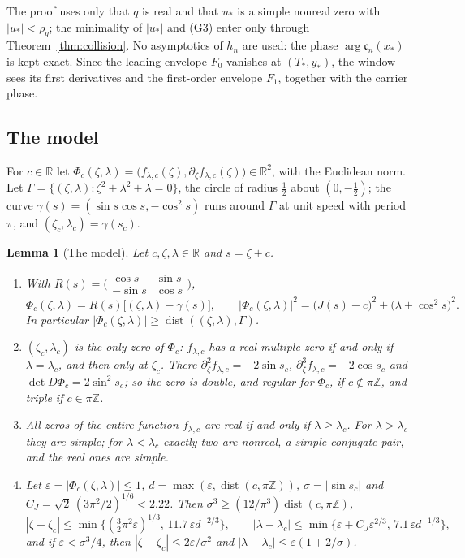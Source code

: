 \documentclass[11pt]{amsart}
\newtheorem{lemma}[theorem]{Lemma}
\theoremstyle{definition}
\theoremstyle{remark}
\numberwithin{equation}{section}
\newcommand{\R}{\mathbb{R}}
\newcommand{\Z}{\mathbb{Z}}
\newcommand{\eps}{\varepsilon}
\DeclareMathOperator{\dist}{dist}
\begin{document}
The proof uses only that $q$ is real and that $u_*$ is a simple nonreal zero with $|u_*|<\rho_q$; the minimality of $|u_*|$
and (G3) enter only through Theorem~\ref{thm:collision}. No asymptotics of $h_n$ are used: the phase
$\arg\mathfrak c_n(x_*)$ is kept exact. Since the leading envelope $F_0$ vanishes at $(T_*,y_*)$, the window sees its
first derivatives and the first-order envelope $F_1$, together with the carrier phase.

\subsection{The model}\label{sec:model}

For $c\in\R$ let $\Phi_c(\zeta,\lambda)=\bigl(f_{\lambda,c}(\zeta),\partial_\zeta f_{\lambda,c}(\zeta)\bigr)\in\R^2$, with the
Euclidean norm. Let $\Gamma=\{(\zeta,\lambda):\zeta^2+\lambda^2+\lambda=0\}$, the circle of radius $\frac12$ about
$(0,-\frac12)$; the curve $\gamma(s)=(\sin s\cos s,-\cos^2s)$ runs around $\Gamma$ at unit speed with period $\pi$, and
$(\zeta_c,\lambda_c)=\gamma(s_c)$.

\begin{lemma}[The model]\label{lem:model}
Let $c,\zeta,\lambda\in\R$ and $s=\zeta+c$.
\begin{enumerate}
\item[(a)] With $R(s)=\bigl(\begin{smallmatrix}\cos s&\sin s\\-\sin s&\cos s\end{smallmatrix}\bigr)$,
\[
\Phi_c(\zeta,\lambda)=R(s)\bigl[(\zeta,\lambda)-\gamma(s)\bigr],\qquad
|\Phi_c(\zeta,\lambda)|^2=\bigl(J(s)-c\bigr)^2+\bigl(\lambda+\cos^2s\bigr)^2 .
\]
In particular $|\Phi_c(\zeta,\lambda)|\ge\dist((\zeta,\lambda),\Gamma)$.
\item[(b)] $(\zeta_c,\lambda_c)$ is the only zero of $\Phi_c$: $f_{\lambda,c}$ has a real multiple zero if and only if
$\lambda=\lambda_c$, and then only at $\zeta_c$. There $\partial_\zeta^2f_{\lambda,c}=-2\sin s_c$,
$\partial_\zeta^3f_{\lambda,c}=-2\cos s_c$ and $\det D\Phi_c=2\sin^2s_c$; so the zero is double, and regular for
$\Phi_c$, if $c\notin\pi\Z$, and triple if $c\in\pi\Z$.
\item[(c)] All zeros of the entire function $f_{\lambda,c}$ are real if and only if $\lambda\ge\lambda_c$. For
$\lambda>\lambda_c$ they are simple; for $\lambda<\lambda_c$ exactly two are nonreal, a simple conjugate pair, and the
real ones are simple.
\item[(d)] Let $\eps=|\Phi_c(\zeta,\lambda)|\le1$, $d=\max(\eps,\dist(c,\pi\Z))$, $\sigma=|\sin s_c|$ and
$C_J=\sqrt2\,(3\pi^2/2)^{1/6}<2.22$. Then $\sigma^3\ge(12/\pi^3)\dist(c,\pi\Z)$,
\[
|\zeta-\zeta_c|\le\min\bigl\{(\tfrac32\pi^2\eps)^{1/3},\,11.7\,\eps d^{-2/3}\bigr\},\qquad
|\lambda-\lambda_c|\le\min\bigl\{\eps+C_J\eps^{2/3},\,7.1\,\eps d^{-1/3}\bigr\},
\]
and if $\eps<\sigma^3/4$, then $|\zeta-\zeta_c|\le2\eps/\sigma^2$ and $|\lambda-\lambda_c|\le\eps(1+2/\sigma)$.
\end{enumerate}
\end{lemma}
\end{document}
